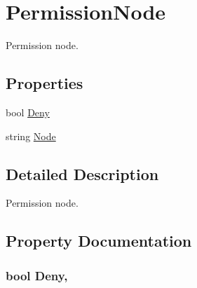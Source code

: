 \hypertarget{structOTA_1_1Data_1_1PermissionNode}{}\section{Permission\+Node}
\label{structOTA_1_1Data_1_1PermissionNode}


Permission node.  


\subsection*{Properties}
\begin{DoxyCompactItemize}
\item 
bool \hyperlink{structOTA_1_1Data_1_1PermissionNode_a5955d5846b0f297efe1d830d1b854279}{Deny}
\item 
string \hyperlink{structOTA_1_1Data_1_1PermissionNode_ad44054822436f80660a4b86199b49fd3}{Node}
\end{DoxyCompactItemize}


\subsection{Detailed Description}
Permission node. 



\subsection{Property Documentation}
\hypertarget{structOTA_1_1Data_1_1PermissionNode_a5955d5846b0f297efe1d830d1b854279}{}
\subsubsection[{Deny}]{\setlength{\rightskip}{0pt plus 5cm}bool Deny\hspace{0.3cm}{\ttfamily [get]}, {\ttfamily [set]}}\label{structOTA_1_1Data_1_1PermissionNode_a5955d5846b0f297efe1d830d1b854279}
\hypertarget{structOTA_1_1Data_1_1PermissionNode_ad44054822436f80660a4b86199b49fd3}{}
